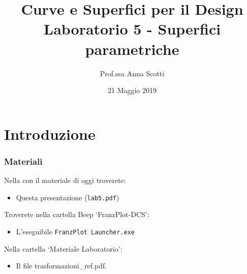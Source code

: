 \documentclass{beamer}
\title[Curve e Sup. - Lab 5]{Curve e Superfici per il Design \\ Laboratorio 5 - Superfici parametriche}
\author[Prof.ssa Scotti]{Prof.ssa Anna Scotti}
\date{21 Maggio 2019}
\begin{document}
\lstset{language=POV}
\begin{frame}
\maketitle
\end{frame}
\section{Introduzione}
\begin{frame}
\frametitle{Materiali}
Nella con il materiale di oggi troverete:
\begin{itemize}
\item Questa presentazione (\texttt{lab5.pdf})
\end{itemize}
Troverete nella cartella Beep `FranzPlot-DCS':
\begin{itemize}
\item L'eseguibile \texttt{FranzPlot Launcher.exe}
\end{itemize}
Nella cartella `Materiale Laboratorio':
\begin{itemize}
\item Il file trasformazioni\_ref.pdf.
\end{itemize}
\end{frame}
%
\end{document}
